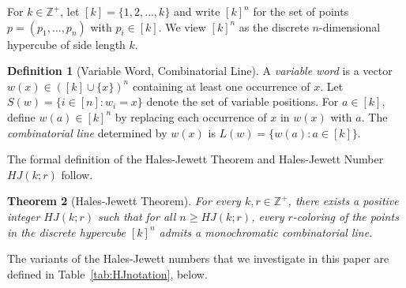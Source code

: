 \documentclass[11pt]{article}
\newtheorem{thm}{Theorem}
\theoremstyle{definition}
\newtheorem{defn}[thm]{Definition}
\begin{document}
For $k \in \mathbb{Z}^+$, let $[k] = \{1,2,\dots,k\}$ and write $[k]^n$ for the set of points $p=(p_1,\dots,p_n)$ with $p_i \in [k]$. We view $[k]^n$ as the  discrete $n$-dimensional hypercube of side length $k$.


\begin{defn}[Variable Word, Combinatorial Line]
    A \emph{variable word} is a vector $w(x) \in ([k]\cup\{x\})^n$ containing at least one occurrence of $x$. Let $S(w)=\{i \in [n] : w_i=x\}$ denote the set of variable positions. For $a \in [k]$, define $w(a)\in [k]^n$ by replacing each occurrence of $x$ in $w(x)$ with $a$.
The \emph{combinatorial line} determined by $w(x)$ is
$
L(w)=\{w(a) : a \in [k]\}.
$
\end{defn}



The formal definition of the Hales-Jewett Theorem and Hales-Jewett Number $HJ(k;r)$ follow.

\begin{thm}[Hales-Jewett Theorem]\label{thm2}
For every $k,r \in \mathbb{Z}^+$, there exists a positive integer $HJ(k;r)$ such that for all $n \ge HJ(k;r)$, every $r$-coloring of the points in the discrete hypercube $[k]^n$ admits a monochromatic combinatorial line.
\end{thm}

The variants of the Hales-Jewett numbers that we investigate in this paper are defined in Table~\ref{tab:HJnotation}, below.
\end{document}
